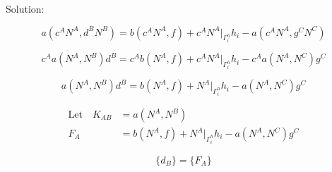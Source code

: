 \documentclass[a4paper, 12pt]{article}
\begin{document}
\noindent
Solution:

\begin{equation*}
a(c^{A} N^{A}, d^{B} N^{B})
 = b( c^{A} N^{A} , f)
  + c^{A} N^{A}\Big|_{\Gamma^{h}_{i}} h_{i}
  - a( c^{A} N^{A}, g^{C} N^{C})
\end{equation*}

\begin{equation*}
c^{A} a(N^{A}, N^{B})d^{B}
 = c^{A} b( N^{A} , f)
  + c^{A} N^{A}\Big|_{\Gamma^{h}_{i}} h_{i}
  - c^{A}a( N^{A}, N^{C})g^{C}
\end{equation*}

\begin{equation*}
a(N^{A}, N^{B})d^{B}
 = b( N^{A} , f)
  + N^{A}\Big|_{\Gamma^{h}_{i}} h_{i}
  - a( N^{A}, N^{C})g^{C}
\end{equation*}

\begin{align*}
\text{Let}\quad K_{AB} &= a(N^{A}, N^{B}) \\
F_A &= b( N^{A} , f)
  + N^{A}\Big|_{\Gamma^{h}_{i}} h_{i}
  - a( N^{A}, N^{C})g^{C}
\end{align*}

\begin{equation*}
[ K_{AB} ] \{ d_B \} = \{ F_A \}
\end{equation*}
\end{document}
